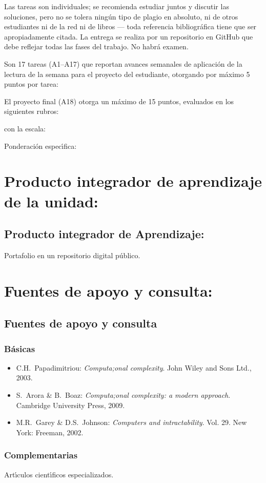 \documentclass[10 pt]{article}
\begin{document}
Las tareas son individuales; se recomienda estudiar juntos y discutir
las soluciones, pero no se tolera ning\'{u}n tipo de plagio en
absoluto, ni de otros estudiantes ni de la red ni de libros --- toda
referencia bibliogr\'{a}fica tiene que ser apropiadamente citada. La
entrega se realiza por un repositorio en GitHub que debe reflejar
todas las fases del trabajo. No habr\'{a} examen.

Son 17 tareas (A1--A17) que reportan avances semanales de
aplicaci\'{o}n de la lectura de la semana para el proyecto del
estudiante, otorgando por m\'{a}ximo 5 puntos por tarea:

El proyecto final (A18) otorga un m\'{a}ximo de 15 puntos, evaluados en los
siguientes rubros:

con la escala:


Ponderaci\'{o}n espec\'{\i}fica:



\newpage

\section{Producto integrador de aprendizaje de la unidad:}
\subsection{Producto integrador de Aprendizaje:} Portafolio en un repositorio digital p\'{u}blico.

\section{Fuentes de apoyo y consulta:}
\subsection{Fuentes de apoyo y consulta}
\subsubsection{B\'{a}sicas}

\begin{itemize}[itemsep=0em]
  
\item{C.H.\ {\sc Papadimitriou}: {\em Computa;onal complexity}. John
    Wiley and Sons Ltd., 2003.}
  
\item{S.\ {\sc Arora} \& B.\ {\sc Boaz}: {\em Computa;onal complexity:
      a modern approach}. Cambridge University Press, 2009.}
  
\item{M.R.\ {\sc Garey} \& D.S.\ {\sc Johnson}: {\em Computers and
      intractability}. Vol. 29. New York: Freeman, 2002.}
  
\end{itemize}

\subsubsection{Complementarias}

Art\'{\i}culos cient\'{\i}ficos especializados.

\label{final} %


\end{document}
